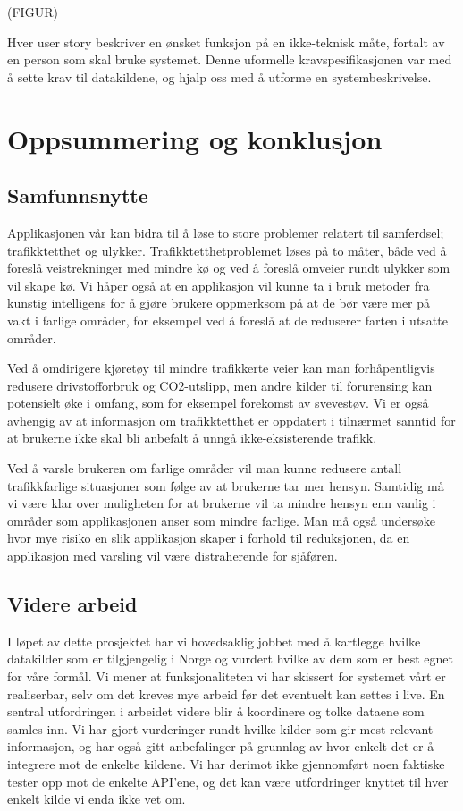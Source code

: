 \documentclass[a4paper,norsk,oneside]{book}
\begin{document}
(FIGUR)

Hver user story beskriver en ønsket funksjon på en ikke-teknisk måte, fortalt av en person som skal bruke systemet. Denne uformelle kravspesifikasjonen var med å sette krav til datakildene, og hjalp oss med å utforme en systembeskrivelse.


\chapter{Oppsummering og konklusjon}
\label{sec:konklusjon}

\section{Samfunnsnytte}
\label{sec:samfunnsnytte}

 Applikasjonen vår kan bidra til å løse to store problemer relatert til samferdsel; trafikktetthet og ulykker. Trafikktetthetproblemet løses på to måter, både ved å foreslå veistrekninger med mindre kø og ved å foreslå omveier rundt ulykker som vil skape kø. Vi håper også at en applikasjon vil kunne ta i bruk metoder fra kunstig intelligens for å gjøre brukere oppmerksom på at de bør være mer på vakt i farlige områder, for eksempel ved å foreslå at de reduserer farten i utsatte områder.

Ved å omdirigere kjøretøy til mindre trafikkerte veier kan man forhåpentligvis redusere drivstofforbruk og CO2-utslipp, men andre kilder til forurensing kan potensielt øke i omfang, som for eksempel forekomst av svevestøv. Vi er også avhengig av at informasjon om trafikktetthet er oppdatert i tilnærmet sanntid for at brukerne ikke skal bli anbefalt å unngå ikke-eksisterende trafikk.

Ved å varsle brukeren om farlige områder vil man kunne redusere antall trafikkfarlige situasjoner som følge av at brukerne tar mer hensyn. Samtidig må vi være klar over muligheten for at brukerne vil ta mindre hensyn enn vanlig i områder som applikasjonen anser som mindre farlige. Man må også undersøke hvor mye risiko en slik applikasjon skaper i forhold til reduksjonen, da en applikasjon med varsling vil være distraherende for sjåføren.


\section{Videre arbeid}
\label{sec:varbeid}

I løpet av dette prosjektet har vi hovedsaklig jobbet med å kartlegge hvilke datakilder som er tilgjengelig i Norge og vurdert hvilke av dem som er best egnet for våre formål. Vi mener at funksjonaliteten vi har skissert for systemet vårt er realiserbar, selv om det kreves mye arbeid før det eventuelt kan settes i live. En sentral utfordringen i arbeidet videre blir å koordinere og tolke dataene som samles inn. Vi har gjort vurderinger rundt hvilke kilder som gir mest relevant informasjon, og har også gitt anbefalinger på grunnlag av hvor enkelt det er å integrere mot de enkelte kildene. Vi har derimot ikke gjennomført noen faktiske tester opp mot de enkelte API'ene, og det kan være utfordringer knyttet til hver enkelt kilde vi enda ikke vet om. 
\end{document}
